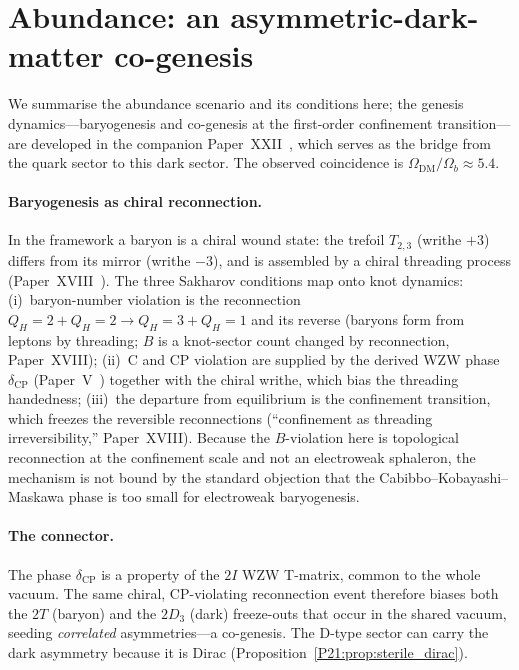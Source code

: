 \documentclass[11pt,a4paper]{article}
\theoremstyle{definition}\newtheorem{definition}[theorem]{Definition}
\theoremstyle{remark}
\newcommand{\twoI}{2I}
\newcommand{\twoT}{2T}
\newcommand{\twoD}{2D}
\newcommand{\QH}{Q_H}
\newcommand{\Odm}{\Omega_{\mathrm{DM}}}
\newcommand{\Ob}{\Omega_{b}}
\begin{document}
\section{Abundance: an asymmetric-dark-matter co-genesis}
\label{P21:sec:abundance}
We summarise the abundance scenario and its conditions here; the genesis
dynamics---baryogenesis and co-genesis at the first-order confinement
transition---are developed in the companion Paper~XXII~\cite{Paper22},
which serves as the bridge from the quark sector to this dark sector. The
observed coincidence is $\Odm/\Ob\approx5.4$.

\paragraph{Baryogenesis as chiral reconnection.} In the framework a
baryon is a chiral wound state: the trefoil $T_{2,3}$ (writhe $+3$)
differs from its mirror (writhe $-3$), and is assembled by a chiral
threading process (Paper~XVIII~\cite{Paper18}). The three Sakharov
conditions map onto knot dynamics: (i)~baryon-number violation is the
reconnection $\QH{=}2+\QH{=}2\to\QH{=}3+\QH{=}1$ and its reverse (baryons
form from leptons by threading; $B$ is a knot-sector count changed by
reconnection, Paper~XVIII); (ii)~C and CP violation are supplied by the
derived WZW phase $\delta_{\mathrm{CP}}$ (Paper~V~\cite{Paper5}) together
with the chiral writhe, which bias the threading handedness; (iii)~the
departure from equilibrium is the confinement transition, which freezes
the reversible reconnections (``confinement as threading
irreversibility,'' Paper~XVIII). Because the $B$-violation here is
topological reconnection at the confinement scale and not an electroweak
sphaleron, the mechanism is not bound by the standard objection that the
Cabibbo--Kobayashi--Maskawa phase is too small for electroweak
baryogenesis.

\paragraph{The connector.} The phase $\delta_{\mathrm{CP}}$ is a property
of the $\twoI$ WZW T-matrix, common to the whole vacuum. The same chiral,
CP-violating reconnection event therefore biases both the $\twoT$ (baryon)
and the $\twoD_3$ (dark) freeze-outs that occur in the shared vacuum,
seeding \emph{correlated} asymmetries---a co-genesis. The D-type sector
can carry the dark asymmetry because it is Dirac
(Proposition~\ref{P21:prop:sterile_dirac}).
\end{document}
